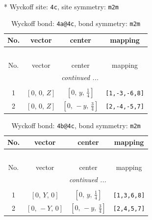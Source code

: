 \documentclass[fleqn,8pt]{jsarticle}
\begin{document}
* Wyckoff site: {\tt 4c}, site symmetry: {\tt m2m}
\renewcommand{\arraystretch}{1.2}
\begin{longtable}{cccc}
\caption{Wyckoff bond: {\tt 4a@4c}, bond symmetry: {\tt m2m}}
 \\
 \hline \hline
No. & vector & center & mapping \\ \hline \endfirsthead

\multicolumn{3}{l}{\tablename\ \thetable{}} \\
 \hline \hline
No. & vector & center & mapping \\ \hline \endhead

 \hline \hline
\multicolumn{3}{r}{\footnotesize\it continued ...} \\ \endfoot

 \hline \hline
\multicolumn{3}{r}{} \\ \endlastfoot

1 & $\left[ 0,\, 0,\, Z \right]$ & $\left[ 0,\, y,\, \frac{1}{4} \right]$ & {\tt [1,-3,-6,8]} \\ \hline
2 & $\left[ 0,\, 0,\, Z \right]$ & $\left[ 0,\, - y,\, \frac{3}{4} \right]$ & {\tt [2,-4,-5,7]} \\
\end{longtable}
\renewcommand{\arraystretch}{1.2}
\begin{longtable}{cccc}
\caption{Wyckoff bond: {\tt 4b@4c}, bond symmetry: {\tt m2m}}
 \\
 \hline \hline
No. & vector & center & mapping \\ \hline \endfirsthead

\multicolumn{3}{l}{\tablename\ \thetable{}} \\
 \hline \hline
No. & vector & center & mapping \\ \hline \endhead

 \hline \hline
\multicolumn{3}{r}{\footnotesize\it continued ...} \\ \endfoot

 \hline \hline
\multicolumn{3}{r}{} \\ \endlastfoot

1 & $\left[ 0,\, Y,\, 0 \right]$ & $\left[ 0,\, y,\, \frac{1}{4} \right]$ & {\tt [1,3,6,8]} \\ \hline
2 & $\left[ 0,\, - Y,\, 0 \right]$ & $\left[ 0,\, - y,\, \frac{3}{4} \right]$ & {\tt [2,4,5,7]} \\
\end{longtable}
\renewcommand{\arraystretch}{1.2}
\end{document}
